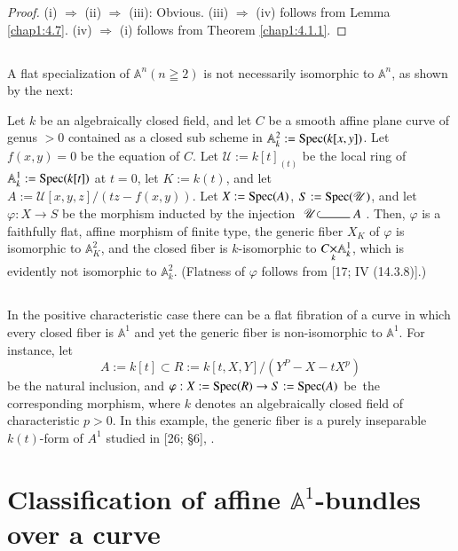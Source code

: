 \begin{proof}
(i) $\Longrightarrow$ (ii) $\Longrightarrow$ (iii): Obvious. (iii)
  $\Longrightarrow$ (iv) follows from Lemma \ref{chap1:4.7}. (iv)
  $\Longrightarrow$ (i) follows from Theorem \ref{chap1:4.1.1}.
\end{proof}

\subsection{}\label{chap1:4.10}
A flat specialization of $\mathbb{A}^{n}(n\geqq 2)$ is not necessarily
isomorphic to $\mathbb{A}^{n}$, as shown by the next:

\begin{example*}
Let $k$ be an algebraically closed field, and let $C$ be a smooth
affine plane curve of genus $>0$ contained as a closed sub scheme in
$\mathbb{A}^{2}_{k}:=\operatorname{Spec}(k[x,y])$. Let $f(x,y)=0$ be the equation of
$C$. Let $\mathscr{U}:=k[t]_{(t)}$ be the local ring of
$\mathbb{A}^{1}_{k}:= \operatorname{Spec}(k[t])$ at $t=0$, let $K:=k(t)$, and let
$A:=\mathscr{U}[x,y,z]/(tz-f(x,y))$. Let $X:=\operatorname{Spec}(A)$,
$S:=\operatorname{Spec}(\mathscr{U})$, and let $\varphi:X\to S$ be the morphism
inducted by the injection
$\xymatrix@R=.3cm{\mathscr{U}\ar@<-.25em>@{^{(}-}[r] & A}$. Then,
$\varphi$ is a faithfully flat, affine morphism of finite type, the
generic fiber $X_{K}$ of $\varphi$ is isomorphic to
$\mathbb{A}^{2}_{K}$, and the closed fiber is $k$-isomorphic to
$\fprod{C}{\mathbb{A}^{1}_{k}}{k}$, which is evidently  not isomorphic
to $\mathbb{A}^{2}_{k}$. (Flatness of $\varphi$ follows from [17; IV
  (14.3.8)].) 
\end{example*}

\subsection{}\label{chap1:4.11} 
In the positive characteristic case there can be a flat fibration of a
curve in which every closed fiber is $\mathbb{A}^{1}$ and yet the
generic fiber is non-isomor\-phic to $\mathbb{A}^{1}$. For instance, let
$$
A:=k[t]\subset R:=k[t,X,Y]/(Y^{P}-X-tX^{p})
$$
be the natural inclusion, and $\varphi:X:=\operatorname{Spec}(R)\to S:=\operatorname{Spec} (A)$
be\pageoriginale\ the corresponding morphism, where $k$ denotes an
algebraically closed field of characteristic $p>0$. In this example,
the generic fiber is a purely inseparable $k(t)$-form of $A^{1}$
studied in [26; \S 6], \cite{27}. 

\section{Classification of affine $\mathbb{A}^{1}$-bundles over a
  curve}\pageoriginale\ \label{chap1:sec5}

